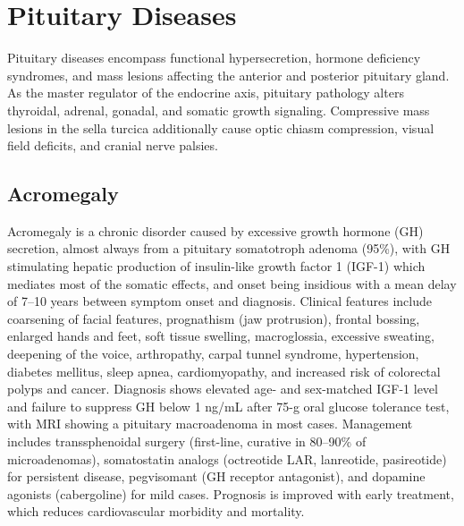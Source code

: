 \section{Pituitary Diseases}




Pituitary diseases encompass functional hypersecretion, hormone deficiency syndromes, and mass lesions affecting the anterior and posterior pituitary gland. As the master regulator of the endocrine axis, pituitary pathology alters thyroidal, adrenal, gonadal, and somatic growth signaling. Compressive mass lesions in the sella turcica additionally cause optic chiasm compression, visual field deficits, and cranial nerve palsies.





\label{sec:Pituitary Diseases}

\subsection{Acromegaly}
\label{sec:Acromegaly}
Acromegaly is a chronic disorder caused by excessive growth hormone (GH) secretion, almost always from a pituitary somatotroph adenoma (95\%), with GH stimulating hepatic production of insulin-like growth factor 1 (IGF-1) which mediates most of the somatic effects, and onset being insidious with a mean delay of 7--10 years between symptom onset and diagnosis. Clinical features include coarsening of facial features, prognathism (jaw protrusion), frontal bossing, enlarged hands and feet, soft tissue swelling, macroglossia, excessive sweating, deepening of the voice, arthropathy, carpal tunnel syndrome, hypertension, diabetes mellitus, sleep apnea, cardiomyopathy, and increased risk of colorectal polyps and cancer. Diagnosis shows elevated age- and sex-matched IGF-1 level and failure to suppress GH below 1 ng/mL after 75-g oral glucose tolerance test, with MRI showing a pituitary macroadenoma in most cases. Management includes transsphenoidal surgery (first-line, curative in 80--90\% of microadenomas), somatostatin analogs (octreotide LAR, lanreotide, pasireotide) for persistent disease, pegvisomant (GH receptor antagonist), and dopamine agonists (cabergoline) for mild cases. Prognosis is improved with early treatment, which reduces cardiovascular morbidity and mortality.

